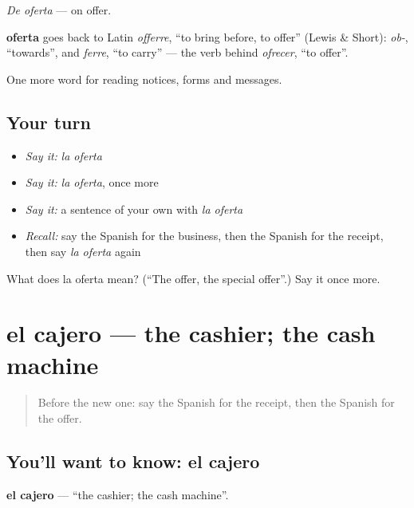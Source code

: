 \emph{De oferta} — on offer.

\begin{cousinweb}
\textbf{oferta} goes back to Latin \emph{offerre}, \textquotedblleft{}to bring before, to offer\textquotedblright{} (Lewis \& Short): \emph{ob-}, \textquotedblleft{}towards\textquotedblright{}, and \emph{ferre}, \textquotedblleft{}to carry\textquotedblright{} — the verb behind \emph{ofrecer}, \textquotedblleft{}to offer\textquotedblright{}.
\end{cousinweb}

\begin{grammarlens}[title={What you've built}]
One more word for reading notices, forms and messages.
\end{grammarlens}

\subsection*{Your turn}
\begin{itemize}
\raggedright
  \item \emph{Say it:} \emph{la oferta}
  \item \emph{Say it:} \emph{la oferta}, once more
  \item \emph{Say it:} a sentence of your own with \emph{la oferta}
  \item \emph{Recall:} say the Spanish for the business, then the Spanish for the receipt, then say \emph{la oferta} again
\end{itemize}

\begin{tcolorbox}[breakable,colback=teal!4,colframe=teal!35!black,title={Before you move on}]
What does la oferta mean? (\textquotedblleft{}The offer, the special offer\textquotedblright{}.) Say it once more.
\end{tcolorbox}
\section[el cajero]{el cajero — the cashier; the cash machine}

\label{lesson:ES-C491-cajero}



\begin{quote}
Before the new one: say the Spanish for the receipt, then the Spanish for the offer.
\end{quote}

\subsection*{You'll want to know: el cajero}
\textbf{el cajero} — \textquotedblleft{}the cashier; the cash machine\textquotedblright{}.

